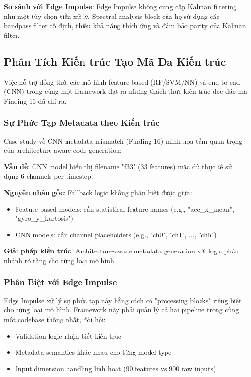 \textbf{So sánh với Edge Impulse}: Edge Impulse không cung cấp Kalman filtering như một tùy chọn tiền xử lý. Spectral analysis block của họ sử dụng các bandpass filter cố định, thiếu khả năng thích ứng và đảm bảo parity của Kalman filter.

\subsection{Phân Tích Kiến trúc Tạo Mã Đa Kiến trúc}
\label{sec:disc_multi_arch}

Việc hỗ trợ đồng thời các mô hình feature-based (RF/SVM/NN) và end-to-end (CNN) trong cùng một framework đặt ra những thách thức kiến trúc độc đáo mà Finding 16 đã chỉ ra.

\subsubsection{Sự Phức Tạp Metadata theo Kiến trúc}
Case study về CNN metadata mismatch (Finding 16) minh họa tầm quan trọng của architecture-aware code generation:

\textbf{Vấn đề}: CNN model hiển thị filename "f33" (33 features) mặc dù thực tế sử dụng 6 channels per timestep.

\textbf{Nguyên nhân gốc}: Fallback logic không phân biệt được giữa:
\begin{itemize}
    \item Feature-based models: cần statistical feature names (e.g., "acc\_x\_mean", "gyro\_y\_kurtosis")  
    \item CNN models: cần channel placeholders (e.g., "ch0", "ch1", ..., "ch5")
\end{itemize}

\textbf{Giải pháp kiến trúc}: Architecture-aware metadata generation với logic phân nhánh rõ ràng cho từng loại mô hình.

\subsubsection{Phân Biệt với Edge Impulse}
Edge Impulse xử lý sự phức tạp này bằng cách có "processing blocks" riêng biệt cho từng loại mô hình. Framework này phải quản lý cả hai pipeline trong cùng một codebase thống nhất, đòi hỏi:
\begin{itemize}
    \item Validation logic nhận biết kiến trúc
    \item Metadata semantics khác nhau cho từng model type
    \item Input dimension handling linh hoạt (90 features vs 900 raw inputs)
\end{itemize}

